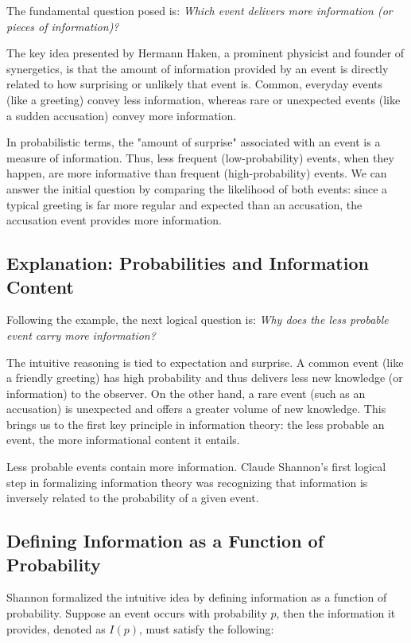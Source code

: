 \documentclass[12pt,a4paper]{article}
\newenvironment{rembox}[1][]{%
  \begin{tcolorbox}[enhanced, breakable, colback=gray!5, colframe=gray!50, title=#1, fonttitle=\bfseries, arc=3pt, boxrule=0.5pt]
}{\end{tcolorbox}}
\begin{document}
The fundamental question posed is: \textit{Which event delivers more information (or pieces of information)?}

\begin{rembox}[Intuition Behind Information Content]
The key idea presented by Hermann Haken, a prominent physicist and founder of synergetics, is that the amount of information provided by an event is directly related to how surprising or unlikely that event is. Common, everyday events (like a greeting) convey less information, whereas rare or unexpected events (like a sudden accusation) convey more information.
\end{rembox}

In probabilistic terms, the "amount of surprise" associated with an event is a measure of information. Thus, less frequent (low-probability) events, when they happen, are more informative than frequent (high-probability) events. We can answer the initial question by comparing the likelihood of both events: since a typical greeting is far more regular and expected than an accusation, the accusation event provides more information.

\subsection{Explanation: Probabilities and Information Content}
Following the example, the next logical question is: \textit{Why does the less probable event carry more information?}

The intuitive reasoning is tied to expectation and surprise. A common event (like a friendly greeting) has high probability and thus delivers less new knowledge (or information) to the observer. On the other hand, a rare event (such as an accusation) is unexpected and offers a greater volume of new knowledge. This brings us to the first key principle in information theory: the less probable an event, the more informational content it entails.

\begin{rembox}[Shannon’s First Logical Step]
Less probable events contain more information. Claude Shannon’s first logical step in formalizing information theory was recognizing that information is inversely related to the probability of a given event.
\end{rembox}

\subsection{Defining Information as a Function of Probability}
Shannon formalized the intuitive idea by defining information as a function of probability. Suppose an event occurs with probability $p$, then the information it provides, denoted as $I(p)$, must satisfy the following:
\end{document}
